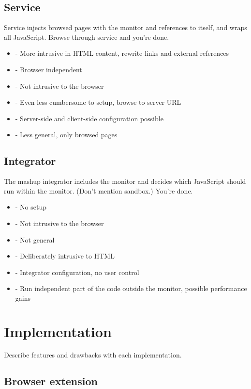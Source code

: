 \documentclass{llncs}
\begin{document}
\subsection{Service}

Service injects browsed pages with the monitor and references to itself, and 
wraps all JavaScript. Browse through service and you're done.
\begin{itemize}
\item- More intrusive in HTML content, rewrite links and external references 
\item- Browser independent
\item- Not intrusive to the browser
\item- Even less cumbersome to setup, browse to server URL
\item- Server-side and client-side configuration possible
\item- Less general, only browsed pages
\end{itemize}

\subsection{Integrator}

The mashup integrator includes the monitor and decides which JavaScript should 
run within the monitor. (Don't mention sandbox.) You're done.
\begin{itemize}
\item- No setup
\item- Not intrusive to the browser
\item- Not general
\item- Deliberately intrusive to HTML
\item- Integrator configuration, no user control
\item- Run independent part of the code outside the monitor, possible performance gains
\end{itemize}


\section{Implementation}
\label{sec:impl}

Describe features and drawbacks with each implementation.


\subsection{Browser extension}
\end{document}

